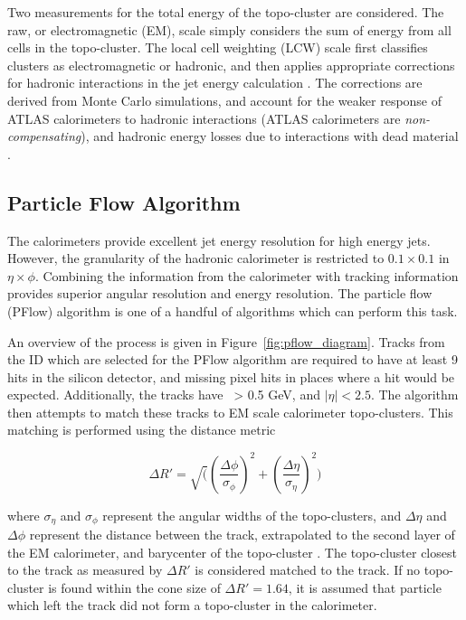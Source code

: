 Two measurements for the total energy of the topo-cluster are considered. The raw, or electromagnetic (EM), scale simply considers the sum of energy from all cells in the topo-cluster. The local cell weighting (LCW) scale first classifies clusters as electromagnetic or hadronic, and then applies appropriate corrections for hadronic interactions in the jet energy calculation \cite{jet_reco}. The corrections are derived from Monte Carlo simulations, and account for the weaker response of ATLAS calorimeters to hadronic interactions (ATLAS calorimeters are \textit{non-compensating}), and hadronic energy losses due to interactions with dead material \cite{topo_clusters}. \par

\subsection{Particle Flow Algorithm}
The calorimeters provide excellent jet energy resolution for high energy jets. However, the granularity of the hadronic calorimeter is restricted to $0.1 \times 0.1$ in $\eta \times \phi$. Combining the information from the calorimeter with tracking information provides superior angular resolution and energy resolution. The particle flow (PFlow) algorithm is one of a handful of algorithms which can perform this task.\par

An overview of the process is given in Figure~\ref{fig:pflow_diagram}. Tracks from the ID which are selected for the PFlow algorithm are required to have at least 9 hits in the silicon detector, and missing pixel hits in places where a hit would be expected. Additionally, the tracks have \pt~> 0.5 GeV, and $|\eta| < 2.5$. The algorithm then attempts to match these tracks to EM scale calorimeter topo-clusters. This matching is performed using the distance metric 

\begin{equation}
	\Delta R' = \sqrt( (\frac{\Delta\phi}{\sigma_\phi})^2 + (\frac{\Delta\eta}{\sigma_\eta})^2 )
\end{equation}

where $\sigma_\eta$ and $\sigma_\phi$ represent the angular widths of the topo-clusters, and $\Delta\eta$ and $\Delta\phi$ represent the distance between the track, extrapolated to the second layer of the EM calorimeter, and barycenter of the topo-cluster \cite{pflow}. The topo-cluster closest to the track as measured by $\Delta R'$ is considered matched to the track. If no topo-cluster is found within the cone size of $\Delta R' = 1.64$, it is assumed that particle which left the track did not form a topo-cluster in the calorimeter. \par 

